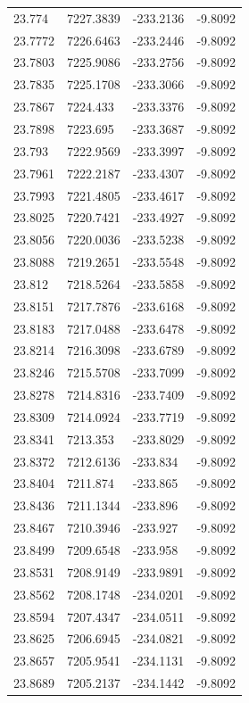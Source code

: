 \begin{table}[H]
\begin{tabular}{llll}
23.774 & 7227.3839 & -233.2136 & -9.8092 \\
23.7772 & 7226.6463 & -233.2446 & -9.8092 \\
23.7803 & 7225.9086 & -233.2756 & -9.8092 \\
23.7835 & 7225.1708 & -233.3066 & -9.8092 \\
23.7867 & 7224.433 & -233.3376 & -9.8092 \\
23.7898 & 7223.695 & -233.3687 & -9.8092 \\
23.793 & 7222.9569 & -233.3997 & -9.8092 \\
23.7961 & 7222.2187 & -233.4307 & -9.8092 \\
23.7993 & 7221.4805 & -233.4617 & -9.8092 \\
23.8025 & 7220.7421 & -233.4927 & -9.8092 \\
23.8056 & 7220.0036 & -233.5238 & -9.8092 \\
23.8088 & 7219.2651 & -233.5548 & -9.8092 \\
23.812 & 7218.5264 & -233.5858 & -9.8092 \\
23.8151 & 7217.7876 & -233.6168 & -9.8092 \\
23.8183 & 7217.0488 & -233.6478 & -9.8092 \\
23.8214 & 7216.3098 & -233.6789 & -9.8092 \\
23.8246 & 7215.5708 & -233.7099 & -9.8092 \\
23.8278 & 7214.8316 & -233.7409 & -9.8092 \\
23.8309 & 7214.0924 & -233.7719 & -9.8092 \\
23.8341 & 7213.353 & -233.8029 & -9.8092 \\
23.8372 & 7212.6136 & -233.834 & -9.8092 \\
23.8404 & 7211.874 & -233.865 & -9.8092 \\
23.8436 & 7211.1344 & -233.896 & -9.8092 \\
23.8467 & 7210.3946 & -233.927 & -9.8092 \\
23.8499 & 7209.6548 & -233.958 & -9.8092 \\
23.8531 & 7208.9149 & -233.9891 & -9.8092 \\
23.8562 & 7208.1748 & -234.0201 & -9.8092 \\
23.8594 & 7207.4347 & -234.0511 & -9.8092 \\
23.8625 & 7206.6945 & -234.0821 & -9.8092 \\
23.8657 & 7205.9541 & -234.1131 & -9.8092 \\
23.8689 & 7205.2137 & -234.1442 & -9.8092 \\

\end{tabular}
\end{table}
